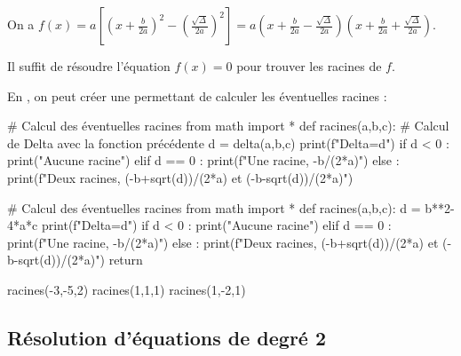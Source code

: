\documentclass[a4paper,11pt]{article}
\begin{document}
\begin{cdemo}
On a $f(x)=a\left[ \left(x+ \frac{b}{2a} \right)^2-\left(\frac{\sqrt{\Delta}}{2a}\right)^2 \right]=a \left(x+ \frac{b}{2a}-\frac{\sqrt{\Delta}}{2a}\right)\left(x+ \frac{b}{2a}+\frac{\sqrt{\Delta}}{2a}\right)$.

\smallskip

Il suffit de résoudre l'équation $f(x)=0$ pour trouver les racines de $f$.
\end{cdemo}

\begin{calgo}
En \calgpython, on peut créer une  permettant de calculer les éventuelles racines :

\begin{tcpythoncode}[15cm]
	\begin{pyverbatim}[][fontsize=\footnotesize,numbers=left,numbersep=10pt]
		# Calcul des éventuelles racines
		from math import *
		def racines(a,b,c):
			# Calcul de Delta avec la fonction précédente
			d = delta(a,b,c)
			print(f"Delta={d}")
			if d < 0 :
				print("Aucune racine")
			elif d == 0 :
				print(f"Une racine, {-b/(2*a)}")
			else :
				print(f"Deux racines, {(-b+sqrt(d))/(2*a)} et {(-b-sqrt(d))/(2*a)}")
	\end{pyverbatim}
\end{tcpythoncode}

\begin{pyconcode}
# Calcul des éventuelles racines
from math import *
def racines(a,b,c):
	d = b**2-4*a*c
	print(f"Delta={d}")
	if d < 0 :
		print("Aucune racine")
	elif d == 0 :
		print(f"Une racine, {-b/(2*a)}")
	else :
		print(f"Deux racines, {(-b+sqrt(d))/(2*a)} et {(-b-sqrt(d))/(2*a)}")
	return
	

\end{pyconcode}

\begin{consolepython}[15cm]
\begin{pyconsole}[][framesep=3mm,frame=single,label={[\scriptsize Début de la console \logopython]\scriptsize Fin de la console \logopython},fontsize=\footnotesize,framerule=1pt,rulecolor=\color{ForestGreen}]
racines(-3,-5,2)
racines(1,1,1)
racines(1,-2,1)
\end{pyconsole}
\end{consolepython}
\smallskip
\end{calgo}

\subsection{Résolution d'équations de degré 2}
\end{document}
